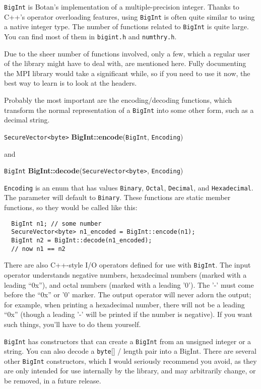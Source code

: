 \documentclass{article}
\newcommand{\filename}[1]{\texttt{#1}}
\newcommand{\function}[1]{\textbf{#1}}
\newcommand{\type}[1]{\texttt{#1}}
\begin{document}
\type{BigInt} is Botan's implementation of a multiple-precision
integer. Thanks to C++'s operator overloading features, using \type{BigInt} is
often quite similar to using a native integer type. The number of functions
related to \type{BigInt} is quite large. You can find most of them in
\filename{bigint.h} and \filename{numthry.h}.

Due to the sheer number of functions involved, only a few, which a regular user
of the library might have to deal with, are mentioned here. Fully documenting
the MPI library would take a significant while, so if you need to use it now,
the best way to learn is to look at the headers.

Probably the most important are the encoding/decoding functions, which
transform the normal representation of a \type{BigInt} into some other form,
such as a decimal string.

\type{SecureVector<byte>} \function{BigInt::encode}(\type{BigInt},
\type{Encoding})

\noindent
and

\type{BigInt} \function{BigInt::decode}(\type{SecureVector<byte>},
\type{Encoding})

\type{Encoding} is an enum that has values \type{Binary}, \type{Octal},
\type{Decimal}, and \type{Hexadecimal}. The parameter will default to
\type{Binary}. These functions are static member functions, so they would be
called like this:

\begin{verbatim}
  BigInt n1; // some number
  SecureVector<byte> n1_encoded = BigInt::encode(n1);
  BigInt n2 = BigInt::decode(n1_encoded);
  // now n1 == n2
\end{verbatim}

There are also C++-style I/O operators defined for use with \type{BigInt}. The
input operator understands negative numbers, hexadecimal numbers (marked with a
leading ``0x''), and octal numbers (marked with a leading '0'). The '-' must
come before the ``0x'' or '0' marker. The output operator will never adorn the
output; for example, when printing a hexadecimal number, there will not be a
leading ``0x'' (though a leading '-' will be printed if the number is
negative). If you want such things, you'll have to do them yourself.

\type{BigInt} has constructors that can create a \type{BigInt} from an unsigned
integer or a string. You can also decode a \type{byte}[] / length pair into a
BigInt. There are several other \type{BigInt} constructors, which I would
seriously recommend you avoid, as they are only intended for use internally by
the library, and may arbitrarily change, or be removed, in a future release.
\end{document}

